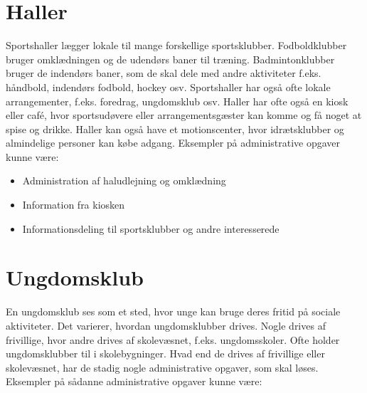 


\section{Haller}

Sportshaller  lægger lokale til mange forskellige sportsklubber.
Fodboldklubber bruger omklædningen og de udendørs baner til træning. 
Badmintonklubber bruger de indendørs baner, som de skal dele med andre aktiviteter f.eks. håndbold, indendørs fodbold, hockey osv.
Sportshaller har også ofte lokale arrangementer, f.eks. foredrag, ungdomsklub osv.
Haller har ofte også en kiosk eller café, hvor sportsudøvere eller arrangementsgæster kan komme og få noget at spise og drikke. 
Haller kan også have et motionscenter, hvor idrætsklubber og almindelige personer kan købe adgang\citep{spt_hal}. 
Eksempler på administrative opgaver kunne være:

\begin{itemize}
  \item Administration af haludlejning og omklædning 
  \item Information fra kiosken
  \item Informationsdeling til sportsklubber og andre interesserede
\end{itemize}


\section{Ungdomsklub}

En ungdomsklub ses som et sted, hvor unge kan bruge deres fritid på sociale aktiviteter.
Det varierer, hvordan ungdomsklubber drives. 
Nogle drives af frivillige, hvor andre drives af skolevæsnet, f.eks. ungdomsskoler\citep{ung1}.
Ofte holder ungdomsklubber til i skolebygninger. 
Hvad end de drives af frivillige eller skolevæsnet, har de stadig nogle administrative opgaver, som skal løses. 
Eksempler på sådanne administrative opgaver kunne være:

